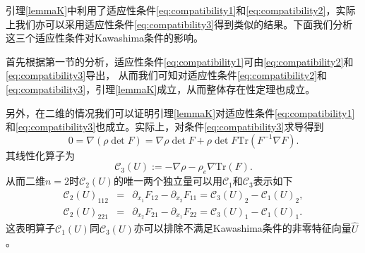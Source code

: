 \begin{remark}
引理\ref{lemmaK}中利用了适应性条件\eqref{eq:compatibility1}和\eqref{eq:compatibility2}，实际上我们亦可以采用适应性条件\eqref{eq:compatibility3}得到类似的结果。下面我们分析这三个适应性条件对Kawashima条件的影响。

首先根据第一节的分析，适应性条件\eqref{eq:compatibility1}可由\eqref{eq:compatibility2}和\eqref{eq:compatibility3}导出，
从而我们可知对适应性条件\eqref{eq:compatibility2}和\eqref{eq:compatibility3}，引理\ref{lemmaK}成立，从而整体存在性定理也成立。

另外，在二维的情况我们可以证明引理\ref{lemmaK}对适应性条件\eqref{eq:compatibility1}和\eqref{eq:compatibility3}也成立。实际上，对条件\eqref{eq:compatibility3}求导得到
$$
0=\nabla (\rho \det F) = \nabla \rho \det F + \rho \det F \mbox{Tr}(F^{-1} \nabla F).
$$
其线性化算子为
\begin{equation*} \label{3}
\mathcal{C}_3(U):=-\nabla \rho - \rho_e \nabla \mbox{Tr}(F).
\end{equation*}
从而二维$n=2$时$\mathcal{C}_2(U)$的唯一两个独立量可以用$\mathcal{C}_1$和$\mathcal{C}_3$表示如下
\begin{eqnarray*}
\mathcal{C}_2(U)_{112}&=&\partial_{x_1}F_{12} - \partial_{x_2}F_{11}= {\mathcal{C}_3(U)}_2 - {\mathcal{C}_1(U)}_2, \\ \mathcal{C}_2(U)_{221}&=&\partial_{x_2}F_{21}-\partial_{x_1}F_{22} = {\mathcal{C}_3(U)}_1 - {\mathcal{C}_1(U)}_1.
\end{eqnarray*}
这表明算子${\mathcal C}_1(U)$同${\mathcal C}_3(U)$亦可以排除不满足Kawashima条件的非零特征向量$\hat{U}$。


\end{remark}
